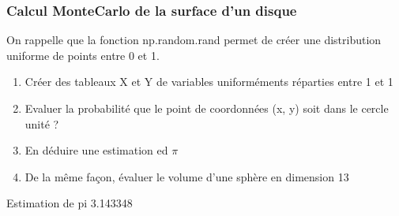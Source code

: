 \documentclass[letterpaper,10pt,english]{sphinxhowto}
\begin{document}
\subsubsection{Calcul Monte\sphinxhyphen{}Carlo de la surface d’un disque}
\label{\detokenize{cours5_numpy_corr_exercices:calcul-monte-carlo-de-la-surface-d-un-disque}}
\sphinxAtStartPar
On rappelle que la fonction np.random.rand permet de créer une distribution uniforme de points entre 0 et 1.
\begin{enumerate}
%
\item {} 
\sphinxAtStartPar
Créer des tableaux X et Y de variables uniforméments réparties entre \sphinxhyphen{}1 et 1

\item {} 
\sphinxAtStartPar
Evaluer la probabilité que le point de coordonnées (x, y) soit dans le cercle unité ?

\item {} 
\sphinxAtStartPar
En déduire une estimation ed \(\pi\)

\item {} 
\sphinxAtStartPar
De la même façon, évaluer le volume d’une sphère en dimension 13

\end{enumerate}

\begin{sphinxVerbatim}[commandchars=\\\{\}]
  

  
  

    
 
\end{sphinxVerbatim}

\begin{sphinxVerbatim}[commandchars=\\\{\}]
Estimation de pi 3.143348
\end{sphinxVerbatim}
\end{document}
